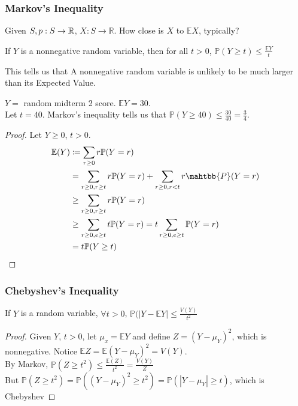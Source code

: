 \documentclass[11pt]{scrartcl}
\begin{document}
\subsubsection{Markov's Inequality}
Given $S, p: S \to \mathbb R$, $X:S\to \mathbb{R}$.  How close is $X$ to $\mathbb{E}X$, typically?
\begin{theorem}
    If $Y$ is a nonnegative random variable, then for all $t>0$, $\mathbb{P}(Y \geq t) \leq \frac{\mathbb{E}Y}{t}$
\end{theorem}
This tells us that A nonnegative random variable is unlikely to be much larger than its Expected Value.
\begin{example}
    $Y =$ random midterm 2 score. $\mathbb{E}Y = 30$.\\
    Let $t=40$. Markov's inequality tells us that $\mathbb{P}(Y \geq 40) \leq \frac{30}{40} = \frac{3}{4}$.
\end{example}
\begin{proof}
    Let $Y \geq 0$, $t > 0$. 
    \begin{align*}
         \mathbb{E}(Y) &\coloneqq \sum_{r\geq 0} r \mathbb{P}(Y=r)\\
    &=\sum_{r\geq 0, r \geq t}r\mathbb{P}(Y =r) + \sum_{r \geq 0, r<t}r\mahtbb{P}(Y=r)\\
    &\geq \sum_{r\geq 0, r \geq t} r \mathbb{P}(Y=r)\\
    &\geq \sum_{r\geq 0, e \geq t}t\mathbb{P}(Y=r) = t\sum_{r\geq 0, e \geq t}\mathbb{P}(Y=r)\\
    &=t \mathbb{P}(Y\geq t)
    \end{align*}
\end{proof}

\subsubsection{Chebyshev's Inequality}
\begin{theorem}
    If $Y$ is a random variable, $\forall t > 0$, $\mathbb{P} (|Y - \mathbb{E}Y| \leq \frac{V(Y)}{t^2}$
\end{theorem}
\begin{proof}
    Given $Y$, $t>0$, let $\mu_x = \mathbb{E}Y$ and define $Z = (Y - \mu_Y)^2$, which is nonnegative. Notice $\mathbb{E}Z = \mathbb{E}(Y - \mu_Y)^2 = V(Y)$. \\
    By Markov, $\mathbb{P}(Z \geq t^2) \leq \frac{\mathbb{E}(Z)}{t^2} = \frac{V(Y)}{Z}$ \\
    But $\mathbb{P}(Z \geq t^2) = \mathbb{P}((Y-\mu_Y)^2 \geq t^2) = \mathbb{P}(|Y-\mu_Y|\geq t) $, which is Chebyshev
\end{proof}
\end{document}
